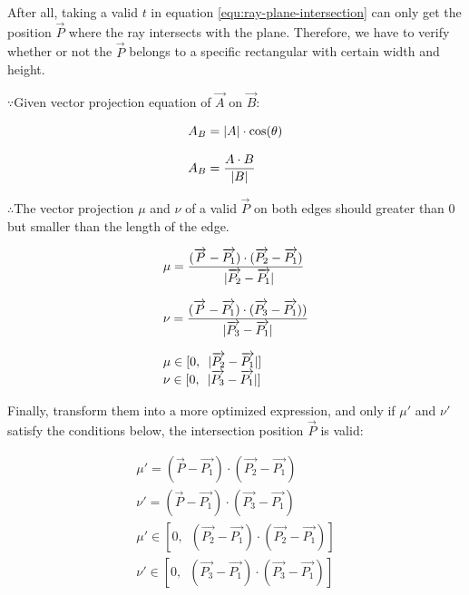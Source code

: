After all, taking a valid $t$ in equation \ref{equ:ray-plane-intersection} can only get the position $\overrightarrow{P}$ where the ray intersects with the plane. Therefore, we have to verify whether or not the $\overrightarrow{P}$ belongs to a specific rectangular with certain width and height. 

$\because$\;\;\;\;Given vector projection equation of $\overrightarrow{A}$ on $\overrightarrow{B}$:

\begin{equation}
\label{equ:vector-projection}
\begin{array}{lr}
A_{B} = \lvert A \rvert \cdot \cos(\theta)\\\\
A_{B} = \dfrac{A \cdot B}{\lvert B \rvert}\\
\end{array}
\end{equation}

$\therefore$\;\;\;\;The vector projection $\mu$ and $\nu$ of a valid $\overrightarrow{P}$ on both edges should greater than $0$ but smaller than the length of the edge.

\[
\begin{array}{lr}
\mu = \dfrac{(\overrightarrow{P} - \overrightarrow{P_1}) \cdot (\overrightarrow{P_2} - \overrightarrow{P_1})}{\enspace\lvert \overrightarrow{P_2} - \overrightarrow{P_1} \rvert}\\\\
\nu = \dfrac{(\overrightarrow{P} - \overrightarrow{P_1}) \cdot (\overrightarrow{P_3} - \overrightarrow{P_1}))}{\lvert \overrightarrow{P_3} - \overrightarrow{P_1} \rvert}\\\\
\mu \in [0,\enspace\lvert \overrightarrow{P_2} - \overrightarrow{P_1} \rvert]\\
\nu \in [0,\enspace\lvert \overrightarrow{P_3} - \overrightarrow{P_1} \rvert]\\
\end{array}
\]

Finally, transform them into a more optimized expression, and only if $\mu'$ and $\nu'$ satisfy the conditions below, the intersection position $\overrightarrow{P}$ is valid:

\[
\begin{array}{lr}
\mu' = (\overrightarrow{P} - \overrightarrow{P_1}) \cdot (\overrightarrow{P_2} - \overrightarrow{P_1})\\
\nu' = (\overrightarrow{P} - \overrightarrow{P_1}) \cdot (\overrightarrow{P_3} - \overrightarrow{P_1})\\
\mu' \in [0,\enspace (\overrightarrow{P_2} - \overrightarrow{P_1}) \cdot (\overrightarrow{P_2} - \overrightarrow{P_1})]\\
\nu' \in [0,\enspace (\overrightarrow{P_3} - \overrightarrow{P_1}) \cdot (\overrightarrow{P_3} - \overrightarrow{P_1})]\\
\end{array}
\]

